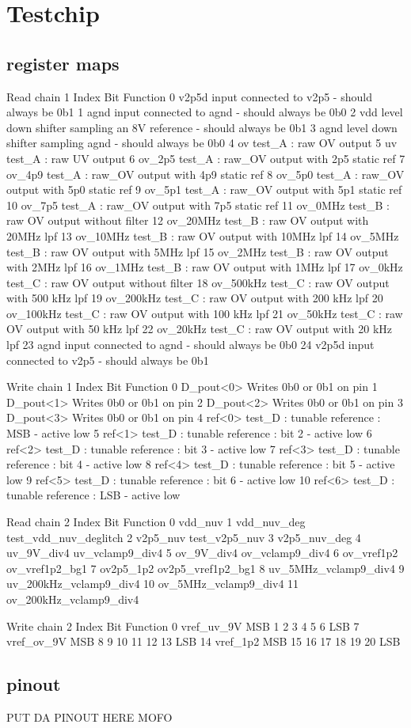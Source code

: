\chapter{Testchip}
\section{register maps}
\label{apx:testchip-register-maps}

Read chain 1
Index	Bit	Function
0	v2p5d	input connected to v2p5 - should always be 0b1
1	agnd	input connected to agnd - should always be 0b0
2	vdd	level down shifter sampling an 8V reference - should always be 0b1
3	agnd	level down shifter sampling agnd - should always be 0b0
4	ov	test_A : raw OV output
5	uv	test_A : raw UV output
6	ov_2p5	test_A : raw_OV output with 2p5 static ref
7	ov_4p9	test_A : raw_OV output with 4p9 static ref
8	ov_5p0	test_A : raw_OV output with 5p0 static ref
9	ov_5p1	test_A : raw_OV output with 5p1 static ref
10	ov_7p5	test_A : raw_OV output with 7p5 static ref
11	ov_0MHz	test_B : raw OV output without filter
12	ov_20MHz	test_B : raw OV output with 20MHz lpf
13	ov_10MHz	test_B : raw OV output with 10MHz lpf
14	ov_5MHz	test_B : raw OV output with 5MHz lpf
15	ov_2MHz	test_B : raw OV output with 2MHz lpf
16	ov_1MHz	test_B : raw OV output with 1MHz lpf
17	ov_0kHz	test_C : raw OV output without filter
18	ov_500kHz	test_C : raw OV output with 500 kHz lpf
19	ov_200kHz	test_C : raw OV output with 200 kHz lpf
20	ov_100kHz	test_C : raw OV output with 100 kHz lpf
21	ov_50kHz	test_C : raw OV output with 50 kHz lpf
22	ov_20kHz	test_C : raw OV output with 20 kHz lpf
23	agnd	input connected to agnd - should always be 0b0
24	v2p5d	input connected to v2p5 - should always be 0b1


Write chain 1
Index	Bit	Function
0	D_pout<0>	Writes 0b0 or 0b1 on pin
1	D_pout<1>	Writes 0b0 or 0b1 on pin
2	D_pout<2>	Writes 0b0 or 0b1 on pin
3	D_pout<3>	Writes 0b0 or 0b1 on pin
4	ref<0>	test_D : tunable reference : MSB - active low
5	ref<1>	test_D : tunable reference : bit 2 - active low
6	ref<2>	test_D : tunable reference : bit 3 - active low
7	ref<3>	test_D : tunable reference : bit 4 - active low
8	ref<4>	test_D : tunable reference : bit 5 - active low
9	ref<5>	test_D : tunable reference : bit 6 - active low
10	ref<6>	test_D : tunable reference : LSB - active low


Read chain 2
Index	Bit	Function
0	vdd_nuv
1	vdd_nuv_deg	test_vdd_nuv_deglitch
2	v2p5_nuv	test_v2p5_nuv
3	v2p5_nuv_deg
4	uv_9V_div4	uv_vclamp9_div4
5	ov_9V_div4	ov_vclamp9_div4
6	ov_vref1p2	ov_vref1p2_bg1
7	ov2p5_1p2	ov2p5_vref1p2_bg1
8		uv_5MHz_vclamp9_div4
9		uv_200kHz_vclamp9_div4
10		ov_5MHz_vclamp9_div4
11		ov_200kHz_vclamp9_div4


Write chain 2
Index	Bit	Function
0	vref_uv_9V	MSB
1
2
3
4
5
6		LSB
7	vref_ov_9V	MSB
8
9
10
11
12
13		LSB
14	vref_1p2	MSB
15
16
17
18
19
20		LSB

\section{pinout}
\label{apx:testchip-pinout}

PUT DA PINOUT HERE MOFO
